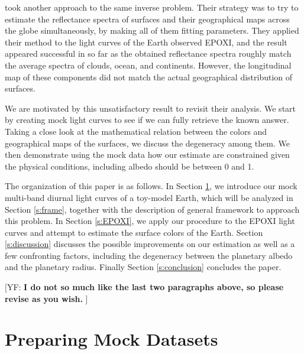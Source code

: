 \documentclass[iop,numberedappendix,apj,]{emulateapj}
\def\memoYF#1{\color{red}[YF: {\bf #1}]\color{black}}
\begin{document}
\citet{Cowan2013} took another approach to the same inverse problem. 
Their strategy was to try to estimate the reflectance spectra of surfaces and their geographical maps across the globe simultaneously, by making all of them fitting parameters. 
They applied their method to the light curves of the Earth observed EPOXI, and the result appeared successful in so far as the obtained reflectance spectra roughly match the average spectra of clouds, ocean, and continents. 
However, the longitudinal map of these components did not match the actual geographical distribution of surfaces. 

We are motivated by this unsatisfactory result to revisit their analysis. 
We start by creating mock light curves to see if we can fully retrieve the known answer. 
Taking a close look at the mathematical relation between the colors and geographical maps of the surfaces, we discuss the degeneracy among them. 
We then demonstrate using the mock data how our estimate are constrained given the physical conditions, including albedo should be between 0 and 1. 

The organization of this paper is as follows. 
In Section \ref{s:mockdata}, we introduce our mock multi-band diurnal light curves of a toy-model Earth, which will be analyzed in Section \ref{s:frame}, together with the description of general framework to approach this problem. 
In Section \ref{s:EPOXI}, we apply our procedure to the EPOXI light curves and attempt to estimate the surface colors of the Earth. 
Section \ref{s:discussion} discusses the possible improvements on our estimation as well as a few confronting factors, including the degeneracy between the planetary albedo and the planetary radius. 
Finally Section \ref{s:conclusion} concludes the paper. 

\memoYF{I do not so much like the last two paragraphs above, so please revise as you wish. }





\section{Preparing Mock Datasets}
\label{s:mockdata}
\end{document}
